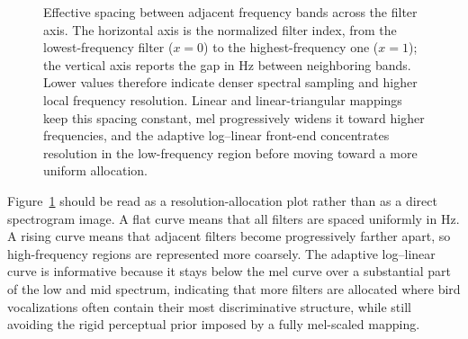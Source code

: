 \documentclass[a4paper,singleside,12pt]{report} %
\begin{document}
		\begin{figure}[H]
			\centering
			\caption[Effective spacing between adjacent frequency bands.]{Effective spacing between adjacent frequency bands across the filter axis. The horizontal axis is the normalized filter index, from the lowest-frequency filter (\(x=0\)) to the highest-frequency one (\(x=1\)); the vertical axis reports the gap in Hz between neighboring bands. Lower values therefore indicate denser spectral sampling and higher local frequency resolution. Linear and linear-triangular mappings keep this spacing constant, mel progressively widens it toward higher frequencies, and the adaptive log--linear front-end concentrates resolution in the low-frequency region before moving toward a more uniform allocation.}
			\label{fig:spectrogram_representation_comparison}
		\end{figure}

		Figure~\ref{fig:spectrogram_representation_comparison} should be read as a resolution-allocation plot rather than as a direct spectrogram image. A flat curve means that all filters are spaced uniformly in Hz. A rising curve means that adjacent filters become progressively farther apart, so high-frequency regions are represented more coarsely. The adaptive log--linear curve is informative because it stays below the mel curve over a substantial part of the low and mid spectrum, indicating that more filters are allocated where bird vocalizations often contain their most discriminative structure, while still avoiding the rigid perceptual prior imposed by a fully mel-scaled mapping.
\end{document}
